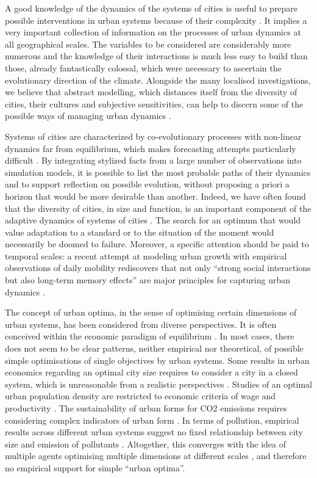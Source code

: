 \documentclass{article}
\begin{document}
A good knowledge of the dynamics of the systems of cities is useful to prepare possible interventions in urban systems because of their complexity \cite{reggiani2021reflections}. It implies a very important collection of information on the processes of urban dynamics at all geographical scales. The variables to be considered are considerably more numerous and the knowledge of their interactions is much less easy to build than those, already fantastically colossal, which were necessary to ascertain the evolutionary direction of the climate. Alongside the many localised investigations, we believe that abstract modelling, which distances itself from the diversity of cities, their cultures and subjective sensitivities, can help to discern some of the possible ways of managing urban dynamics \cite{pumain2017urban}.

Systems of cities are characterized by co-evolutionary processes with non-linear dynamics far from equilibrium, which makes forecasting attempts particularly difficult \cite{raimbault2020unveiling}. By integrating stylized facts from a large number of observations into simulation models, it is possible to list the most probable paths of their dynamics and to support reflection on possible evolution, without proposing a priori a horizon that would be more desirable than another. Indeed, we have often found that the diversity of cities, in size and function, is an important component of the adaptive dynamics of systems of cities \cite{pumain2021co}. The search for an optimum that would value adaptation to a standard or to the situation of the moment would necessarily be doomed to failure. Moreover, a specific attention should be paid to temporal scales: a recent attempt at modeling urban growth with empirical observations of daily mobility rediscovers that not only ``strong social interactions but also long-term memory effects'' are major principles for capturing urban dynamics \cite{xu2021emergence}.

The concept of urban optima, in the sense of optimising certain dimensions of urban systems, has been considered from diverse perspectives. It is often conceived within the economic paradigm of equilibrium \cite{glaeser2008cities}. In most cases, there does not seem to be clear patterns, neither empirical nor theoretical, of possible simple optimisations of single objectives by urban systems. Some results in urban economics regarding an optimal city size requires to consider a city in a closed system, which is unreasonable from a realistic perspectives \cite{singell1974optimum}. Studies of an optimal urban population density are restricted to economic criteria of wage and productivity \cite{su2017density}. The sustainability of urban forms for CO2 emissions requires considering complex indicators of urban form \cite{le2012urban}. In terms of pollution, empirical results across different urban systems suggest no fixed relationship between city size and emission of pollutants \cite{han2016optimum}. Altogether, this converges with the idea of multiple agents optimising multiple dimensions at different scales \cite{pumain2008socio}, and therefore no empirical support for simple ``urban optima''.
\end{document}
